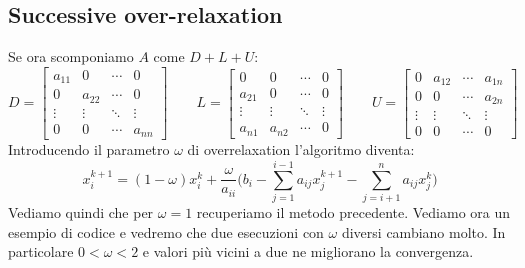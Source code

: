 \documentclass[10pt,a4paper]{article}
\begin{document}
\subsection{Successive over-relaxation}
Se ora scomponiamo $A$ come $D + L + U$:
\begin{equation}
D = 
\begin{bmatrix}
a_{11} & 0 & \cdots & 0 \\
0 & a_{22} & \cdots & 0 \\
\vdots & \vdots & \ddots & \vdots \\
0 & 0 & \cdots & a_{nn}
\end{bmatrix}
\qquad 
L = 
\begin{bmatrix} 0 & 0 & \cdots & 0 \\
a_{21} & 0 & \cdots & 0 \\
\vdots & \vdots & \ddots & \vdots \\
a_{n1} & a_{n2} & \cdots & 0 
\end{bmatrix}
\qquad
U = 
\begin{bmatrix}
0 & a_{12} & \cdots & a_{1n} \\
0 & 0 & \cdots & a_{2n} \\
\vdots & \vdots & \ddots & \vdots \\
0 & 0 & \cdots & 0
\end{bmatrix}
\end{equation}
Introducendo il parametro $\omega$ di overrelaxation l'algoritmo diventa:
\begin{equation}
x^{k+1}_i  = (1 - \omega) x_i^k +  \frac{\omega}{a_{ii}} \Bigg(b_i - \sum_{j=1}^{i-1}a_{ij}x^{k+1}_j - \sum_{j=i+1}^{n}a_{ij}x^{k}_j \Bigg)
\end{equation}
Vediamo quindi che per $\omega=1$ recuperiamo il metodo precedente. Vediamo ora un esempio di codice e vedremo che due esecuzioni con $\omega$ diversi cambiano molto. In particolare $0 < \omega < 2$ e valori più vicini a due ne migliorano la convergenza.
\end{document}
